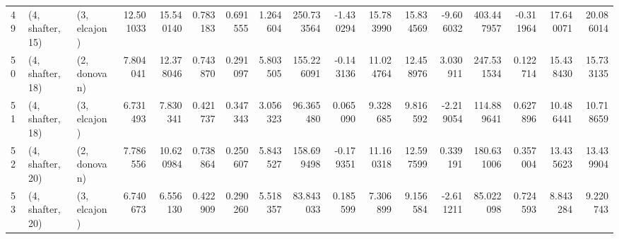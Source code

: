 \begin{tabular}{lllrrrrrrrrrrrrrr}
49 &  (4, shafter, 15) &     (3, elcajon) &  12.501033 &  15.540140 &   0.783183 &  0.691555 &   1.264604 &  250.733564 & -1.430294 &  15.783990 &  15.834569 &  -9.606032 &   403.447957 & -0.311964 &  17.640071 &  20.086014 \\
50 &  (4, shafter, 18) &     (2, donovan) &   7.804041 &  12.378046 &   0.743870 &  0.291097 &   5.803505 &  155.226091 & -0.143136 &  11.024764 &  12.458976 &   3.030911 &   247.531534 &  0.122714 &  15.438430 &  15.733135 \\
51 &  (4, shafter, 18) &     (3, elcajon) &   6.731493 &   7.830341 &   0.421737 &  0.347343 &   3.056323 &   96.365480 &  0.065090 &   9.328685 &   9.816592 &  -2.219054 &   114.889641 &  0.627896 &  10.486441 &  10.718659 \\
52 &  (4, shafter, 20) &     (2, donovan) &   7.786556 &  10.620984 &   0.738864 &  0.250607 &   5.843527 &  158.699498 & -0.179351 &  11.160318 &  12.597599 &   0.339191 &   180.631006 &  0.357004 &  13.435623 &  13.439904 \\
53 &  (4, shafter, 20) &     (3, elcajon) &   6.740673 &   6.556130 &   0.422909 &  0.290260 &   5.518357 &   83.843033 &  0.185599 &   7.306899 &   9.156584 &  -2.611211 &    85.022098 &  0.724593 &   8.843284 &   9.220743 \\
\bottomrule
\end{tabular}
